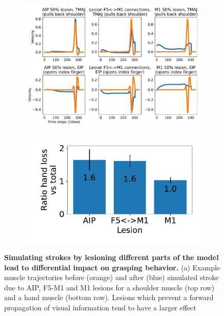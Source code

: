 \documentclass[12pt]{iopart}
\begin{document}
\begin{figure}[h]
	\centering
	\begin{subfigure}[c]{0.62\textwidth}
	    \centering
	    \includegraphics[width=\textwidth]{lesion_trajs.pdf}
	    \caption{}
	\end{subfigure}
	\hfill
	\begin{subfigure}[c]{0.32\textwidth}
	    \centering
	    \includegraphics[width=\textwidth]{lesion_hand.pdf}
	    \caption{}
	\end{subfigure}
	\hfill
	\caption{\textbf{Simulating strokes by lesioning different parts of the model
             lead to differential impact on grasping behavior.}
             (a) Example muscle trajectories before (orange) and after (blue)
             simulated stroke due to AIP, F5-M1 and M1 lesions for a shoulder
             muscle (top row) and a hand muscle (bottom row). Lesions which prevent
             a forward propagation of visual information tend to have a larger effect
}
\end{figure}
\end{document}
